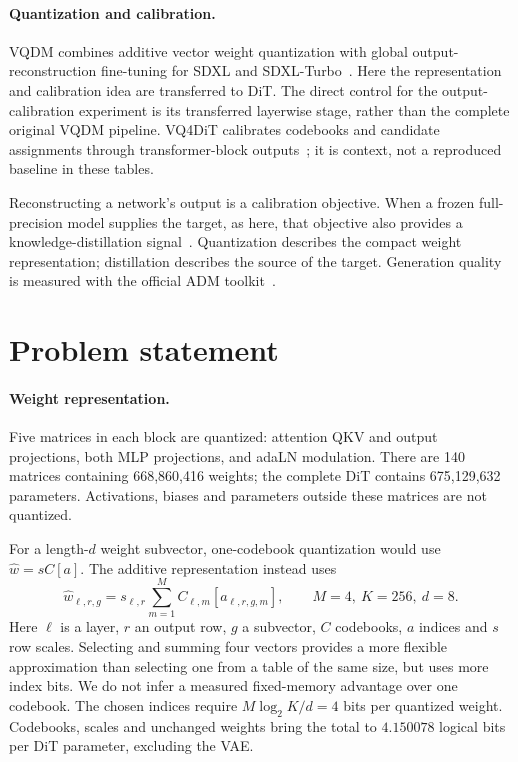 \documentclass{article}
\begin{document}
\paragraph{Quantization and calibration.}
VQDM combines additive vector weight quantization with global output-reconstruction fine-tuning for SDXL and SDXL-Turbo~\citep{egiazarian2024vqdm}. Here the representation and calibration idea are transferred to DiT. The direct control for the output-calibration experiment is its transferred layerwise stage, rather than the complete original VQDM pipeline. VQ4DiT calibrates codebooks and candidate assignments through transformer-block outputs~\citep{deng2025vq4dit}; it is context, not a reproduced baseline in these tables.

Reconstructing a network's output is a calibration objective. When a frozen full-precision model supplies the target, as here, that objective also provides a knowledge-distillation signal~\citep{hinton2015distilling}. Quantization describes the compact weight representation; distillation describes the source of the target. Generation quality is measured with the official ADM toolkit~\citep{dhariwal2021adm}.

\section{Problem statement}
\paragraph{Weight representation.}
Five matrices in each block are quantized: attention QKV and output projections, both MLP projections, and adaLN modulation. There are 140 matrices containing 668,860,416 weights; the complete DiT contains 675,129,632 parameters. Activations, biases and parameters outside these matrices are not quantized.

For a length-$d$ weight subvector, one-codebook quantization would use $\widehat w=sC[a]$. The additive representation instead uses
\begin{equation}
 \widehat w_{\ell,r,g}=s_{\ell,r}\sum_{m=1}^{M}C_{\ell,m}[a_{\ell,r,g,m}],
 \qquad M=4,\ K=256,\ d=8.
 \label{eq:vq}
\end{equation}
Here $\ell$ is a layer, $r$ an output row, $g$ a subvector, $C$ codebooks, $a$ indices and $s$ row scales. Selecting and summing four vectors provides a more flexible approximation than selecting one from a table of the same size, but uses more index bits. We do not infer a measured fixed-memory advantage over one codebook. The chosen indices require $M\log_2K/d=4$ bits per quantized weight. Codebooks, scales and unchanged weights bring the total to $4.150078$ logical bits per DiT parameter, excluding the VAE.
\end{document}
